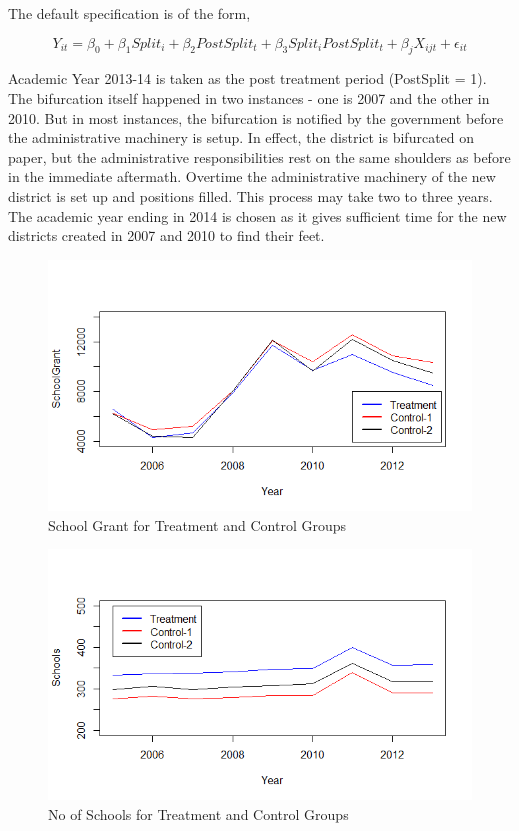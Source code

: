 \documentclass[12pt, a4paper]{article}
\begin{document}
The default specification is of the form,

\[ Y_{it} = \beta_0 + \beta_1 Split_{i} + \beta_2 PostSplit_t + \beta_3 Split_i PostSplit_t + \beta_j X_{ijt} + \epsilon_{it} \]

Academic Year 2013-14 is taken as the post treatment period (PostSplit = 1). The bifurcation itself happened in two instances - one is 2007 and the other in 2010. But in most instances, the bifurcation is notified by the government before the administrative machinery is setup. In effect, the district is bifurcated on paper, but the administrative responsibilities rest on the same shoulders as before in the immediate aftermath. Overtime the administrative machinery of the new district is set up and positions filled. This process may take two to three years. The academic year ending in 2014 is chosen as it gives sufficient time for the new districts created in 2007 and 2010 to find their feet.

\begin{figure}[h!]
	\centering
	\includegraphics[scale = 0.85]{SchoolGrant}
	\caption{School Grant for Treatment and Control Groups}
	\label{Fig3}
\end{figure}

\begin{figure}[h!]
	\centering
	\includegraphics[scale = 0.85]{Schools}
	\caption{No of Schools for Treatment and Control Groups}
	\label{Fig4}
\end{figure}
\end{document}
